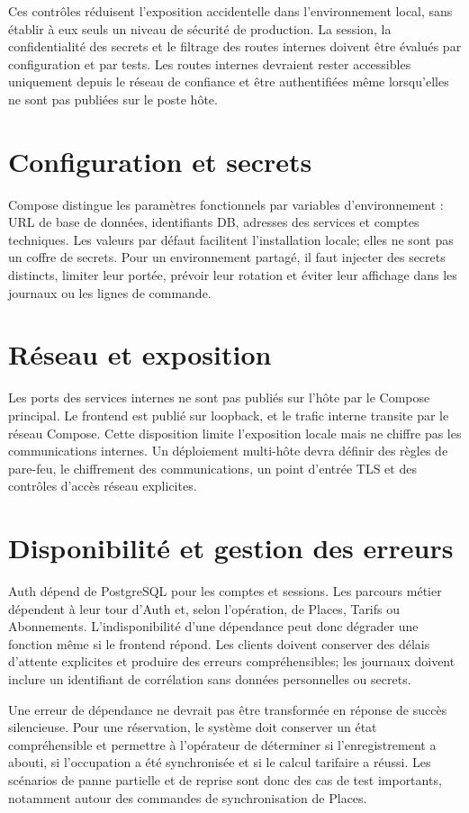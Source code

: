 \documentclass[11pt,a4paper]{report}
\begin{document}
Ces contrôles réduisent l'exposition accidentelle dans l'environnement local, sans établir à eux seuls un niveau de sécurité de production. La session, la confidentialité des secrets et le filtrage des routes internes doivent être évalués par configuration et par tests. Les routes internes devraient rester accessibles uniquement depuis le réseau de confiance et être authentifiées même lorsqu'elles ne sont pas publiées sur le poste hôte.

\section{Configuration et secrets}
Compose distingue les paramètres fonctionnels par variables d'environnement : URL de base de données, identifiants DB, adresses des services et comptes techniques. Les valeurs par défaut facilitent l'installation locale; elles ne sont pas un coffre de secrets. Pour un environnement partagé, il faut injecter des secrets distincts, limiter leur portée, prévoir leur rotation et éviter leur affichage dans les journaux ou les lignes de commande.

\section{Réseau et exposition}
Les ports des services internes ne sont pas publiés sur l'hôte par le Compose principal. Le frontend est publié sur loopback, et le trafic interne transite par le réseau Compose. Cette disposition limite l'exposition locale mais ne chiffre pas les communications internes. Un déploiement multi-hôte devra définir des règles de pare-feu, le chiffrement des communications, un point d'entrée TLS et des contrôles d'accès réseau explicites.

\section{Disponibilité et gestion des erreurs}
Auth dépend de PostgreSQL pour les comptes et sessions. Les parcours métier dépendent à leur tour d'Auth et, selon l'opération, de Places, Tarifs ou Abonnements. L'indisponibilité d'une dépendance peut donc dégrader une fonction même si le frontend répond. Les clients doivent conserver des délais d'attente explicites et produire des erreurs compréhensibles; les journaux doivent inclure un identifiant de corrélation sans données personnelles ou secrets.

Une erreur de dépendance ne devrait pas être transformée en réponse de succès silencieuse. Pour une réservation, le système doit conserver un état compréhensible et permettre à l'opérateur de déterminer si l'enregistrement a abouti, si l'occupation a été synchronisée et si le calcul tarifaire a réussi. Les scénarios de panne partielle et de reprise sont donc des cas de test importants, notamment autour des commandes de synchronisation de Places.
\end{document}
